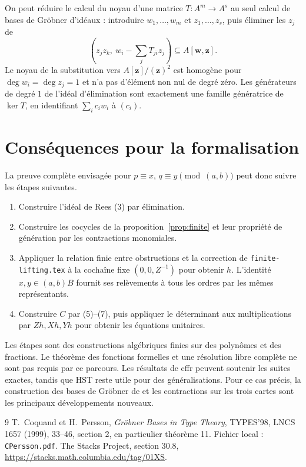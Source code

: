 \documentclass[11pt]{amsart}
\theoremstyle{remark}
\begin{document}
On peut réduire le calcul du noyau d'une matrice $T:A^m\to A^s$
au seul calcul de bases de Gröbner d'idéaux : introduire $w_1,\ldots,w_m$
et $z_1,\ldots,z_s$, puis éliminer les $z_j$ de
\[
 (z_jz_k,\ w_i-\sum_j T_{ji}z_j)\subseteq A[\mathbf w,\mathbf z].
\]
Le noyau de la substitution vers $A[\mathbf z]/(\mathbf z)^2$
est homogène pour $\deg w_i=\deg z_j=1$ et n'a pas d'élément
non nul de degré zéro. Les générateurs de degré $1$ de l'idéal
d'élimination sont exactement une famille génératrice de $\ker T$,
en identifiant $\sum_i c_iw_i$ à $(c_i)$.

\section{Conséquences pour la formalisation}

La preuve complète envisagée pour $p\equiv x$, $q\equiv y\pmod{(a,b)}$
peut donc suivre les étapes suivantes.
\begin{enumerate}
\item Construire l'idéal de Rees (3) par élimination.
\item Construire les cocycles de la proposition~\ref{prop:finite}
et leur propriété de génération par les contractions monomiales.
\item Appliquer la relation finie entre obstructions et la correction
de \texttt{finite-lifting.tex} à la cochaîne fixe $(0,0,Z^{-1})$
pour obtenir $h$. L'identité $x,y\in(a,b)B$ fournit ses relèvements
à tous les ordres par les mêmes représentants.
\item Construire $C$ par (5)--(7), puis appliquer le déterminant
aux multiplications par $Zh,Xh,Yh$ pour obtenir les équations unitaires.
\end{enumerate}
Les étapes sont des constructions algébriques finies sur des polynômes
et des fractions. Le théorème des fonctions formelles et une résolution
libre complète ne sont pas requis par ce parcours.
Les résultats de cffr peuvent soutenir les suites exactes, tandis que
HST reste utile pour des généralisations. Pour ce cas précis, la
construction des bases de Gröbner de \cite{CP} et les contractions
sur les trois cartes sont les principaux développements nouveaux.

\begin{thebibliography}{9}
 T.~Coquand et H.~Persson, \emph{Gröbner Bases in Type Theory},
TYPES'98, LNCS 1657 (1999), 33--46, section 2, en particulier théorème 11.
Fichier local : \texttt{CPersson.pdf}.
 The Stacks Project, section 30.8,
\url{https://stacks.math.columbia.edu/tag/01XS}.
\end{thebibliography}
\end{document}
